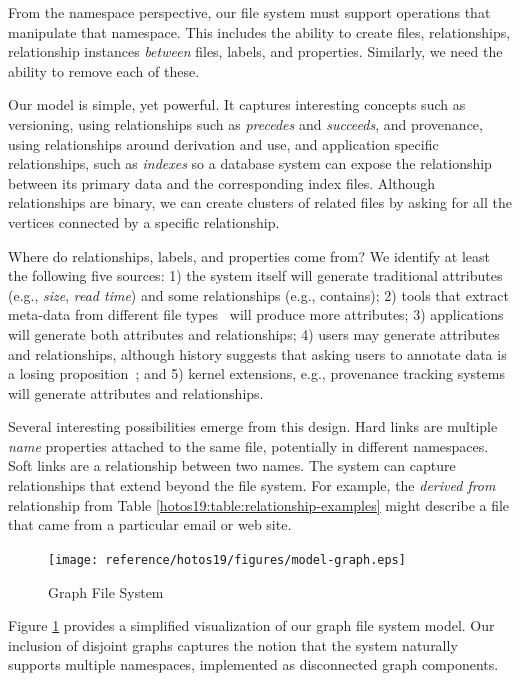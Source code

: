 From the namespace perspective, our file system must support operations that manipulate that
namespace. This includes the ability to create files, relationships,
relationship instances \textit{between} files, labels, and properties.
Similarly, we need the ability to remove each of these.

Our model is simple, yet powerful.  It captures interesting concepts such as versioning, using relationships such as
\textit{precedes} and \textit{succeeds},
and provenance, using relationships around derivation and use,
and application specific relationships, such as \textit{indexes} so a database
system can expose the relationship between its primary data and the
corresponding index files.
Although relationships are binary,
we can create clusters of related files by asking for all the vertices connected
by a specific relationship.

Where do relationships, labels, and properties come from?
We identify at least the following five sources:
1) the system itself will generate traditional
attributes (e.g., \textit{size}, \textit{read time}) and some
relationships (e.g., contains);
2) tools that extract meta-data from different file
types~\cite{soules2004toward,bloehdorn2006tagfs} will produce more attributes;
3) applications will generate both attributes and relationships;
4) users may generate attributes and relationships, although history
suggests that asking users to annotate data is a losing
proposition~\cite{soules2003can}; and
5) kernel extensions, e.g., provenance tracking systems~\cite{pasquier17camflow}
will generate attributes and relationships.

Several interesting possibilities emerge from this design.
Hard links are multiple \textit{name} properties attached to the
same file, potentially in different namespaces.
Soft links are a relationship between two names.
The system can capture relationships that extend beyond the file system.
For example, the \textit{derived from} relationship from
Table \ref{hotos19:table:relationship-examples} might describe a file that came
from a particular email or web site.

\begin{figure}[bt]
    \captionsetup{justification=centering}
    \texttt{[image: reference/hotos19/figures/model-graph.eps]}
    \caption{Graph File System}\label{hotos19:fig:graphfs-example}
\end{figure}

Figure \ref{hotos19:fig:graphfs-example} provides a simplified visualization of our graph file
system model.
Our inclusion of disjoint graphs captures the notion that the system
naturally supports multiple namespaces, implemented as disconnected graph
components.

